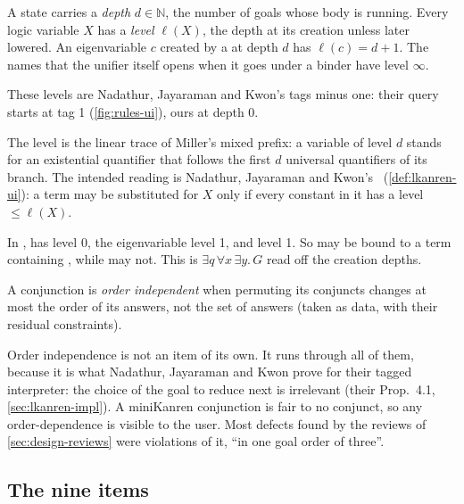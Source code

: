 \begin{definition}\label{def:design-levels}
A state carries a \emph{depth} $d\in\mathbb N$, the number of  goals whose body is running.
Every logic variable $X$ has a \emph{level} $\ell(X)$, the depth at its creation unless later lowered.
An eigenvariable $c$ created by a  at depth $d$ has $\ell(c)=d+1$. The names that the unifier
itself opens when it goes under a binder have level $\infty$.
\end{definition}
These levels are Nadathur, Jayaraman and Kwon's tags minus one: their query starts at tag 1
(\cref{fig:rules-ui}), ours at depth 0.

The level is the linear trace of Miller's mixed prefix: a variable of level $d$ stands for an
existential quantifier that follows the first $d$ universal quantifiers of its branch. The intended
reading is Nadathur, Jayaraman and Kwon's~\cite{NadathurJayaramanKwon1995} (\cref{def:lkanren-ui}): a term may be substituted for $X$ only
if every constant in it has a level $\le \ell(X)$.

\begin{example}
In ,  has level 0, the eigenvariable  level 1,
and  level 1. So  may be bound to a term containing , while  may not. This
is $\exists q\,\forall x\,\exists y.\,G$ read off the creation depths.
\end{example}

\begin{definition}\label{def:design-order}
A conjunction is \emph{order independent} when permuting its conjuncts changes at most the order of its
answers, not the set of answers (taken as data, with their residual constraints).
\end{definition}

Order independence is not an item of its own. It runs through all of them, because it is what
Nadathur, Jayaraman and Kwon prove for their tagged interpreter: the choice of the goal to reduce next
is irrelevant (their Prop.~4.1, \cref{sec:lkanren-impl}). A miniKanren conjunction is fair to no
conjunct, so any order-dependence is visible to the user. Most defects found by the reviews of
\cref{sec:design-reviews} were violations of it, \enquote{in one goal order of three}.

\subsection{The nine items}\label{sec:design-items}

